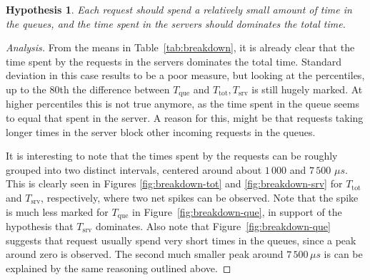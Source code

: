 \documentclass[11pt]{article}
\newcommand\task[1]{{\color[HTML]{999999}\subsection{Task}#1}}
\renewcommand\task[1]{}
\newtheorem{hyp}{Hypothesis}
\theoremstyle{definition}
\newenvironment{ana}[1][\proofname]{\begin{proof}[Analysis]}{\end{proof}}
\newcommand\Ttot{T_{\mathrm{tot}}}
\newcommand\Tque{T_{\mathrm{que}}}
\newcommand\Tsrv{T_{\mathrm{srv}}}
\begin{document}
\begin{hyp}
    Each request should spend a relatively small amount of time in the queues, and the time spent in the servers should dominates the total time.
\end{hyp}
\begin{ana}
    From the means in Table~\ref{tab:breakdown}, it is already clear that the time spent by the requests in the servers dominates the total time.
    Standard deviation in this case results to be a poor measure, but looking at the percentiles, up to the $80$th the difference between $\Tque$ and $\Ttot,\Tsrv$ is still hugely marked.
    At higher percentiles this is not true anymore, as the time spent in the queue seems to equal that spent in the server.
    A reason for this, might be that requests taking longer times in the server block other incoming requests in the queues.
    
    It is interesting to note that the times spent by the requests can be roughly grouped into two distinct intervals, centered around about $1\,000$ and $7\,500$ $\mu s$.
    This is clearly seen in Figures \ref{fig:breakdown-tot} and \ref{fig:breakdown-srv} for $\Ttot$ and $\Tsrv$, respectively, where two net spikes can be observed.
    Note that the spike is much less marked for $\Tque$ in Figure~\ref{fig:breakdown-que}, in support of the hypothesis that $\Tsrv$ dominates.
    Also note that Figure~\ref{fig:breakdown-que} suggests that request usually spend very short times in the queues, since a peak around zero is observed.
    The second much smaller peak around $7\,500\,\mu s$ is can be explained by the same reasoning outlined above.
\end{ana}

\task{
Find the highest throughput of your system for 5 servers with no replication and a read-only workload configuration. What is the minimum number of threads and clients (rounded to multiple of 10) that together achieve this throughput? Explain why the system reaches its maximum throughput at these points and show how the performance changes around these configurations. Provide a detailed breakdown of the time spent in the middleware for each operation type.
}

\clearpage
\end{document}
